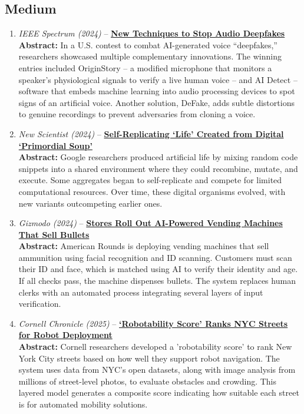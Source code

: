 \documentclass[12pt]{article}
\begin{document}
\subsection*{Medium}
\begin{enumerate}[label=\arabic*.]

 \item \textit{IEEE Spectrum (2024)} -- \href{https://technews.acm.org/archives.cfm?fo=2024-05-may#48}{\textbf{New Techniques to Stop Audio Deepfakes}}\\
\footnotesize\textbf{Abstract:} In a U.S. contest to combat AI-generated voice “deepfakes,” researchers showcased multiple complementary innovations. The winning entries included OriginStory – a modified microphone that monitors a speaker’s physiological signals to verify a live human voice – and AI Detect – software that embeds machine learning into audio processing devices to spot signs of an artificial voice. Another solution, DeFake, adds subtle distortions to genuine recordings to prevent adversaries from cloning a voice.\\

 \item \textit{New Scientist (2024)} -- \href{https://technews.acm.org/archives.cfm?fo=2024-07-jul#27}{\textbf{Self-Replicating ‘Life’ Created from Digital ‘Primordial Soup’}}\\
\footnotesize\textbf{Abstract:} Google researchers produced artificial life by mixing random code snippets into a shared environment where they could recombine, mutate, and execute. Some aggregates began to self-replicate and compete for limited computational resources. Over time, these digital organisms evolved, with new variants outcompeting earlier ones.\\

\clearpage
\item \textit{Gizmodo (2024)} -- \href{https://technews.acm.org/archives.cfm?fo=2024-07-jul#29}{\textbf{Stores Roll Out AI-Powered Vending Machines That Sell Bullets}}\\
   \footnotesize\textbf{Abstract:} American Rounds is deploying vending machines that sell ammunition using facial recognition and ID scanning. Customers must scan their ID and face, which is matched using AI to verify their identity and age. If all checks pass, the machine dispenses bullets. The system replaces human clerks with an automated process integrating several layers of input verification.
 \\

 \item \textit{Cornell Chronicle (2025)} -- \href{https://technews.acm.org/archives.cfm?fo=2025-04-apr#39}{\textbf{‘Robotability Score’ Ranks NYC Streets for Robot Deployment}}\\
   \footnotesize\textbf{Abstract:} Cornell researchers developed a 'robotability score' to rank New York City streets based on how well they support robot navigation. The system uses data from NYC’s open datasets, along with image analysis from millions of street-level photos, to evaluate obstacles and crowding. This layered model generates a composite score indicating how suitable each street is for automated mobility solutions.


\end{enumerate}
\end{document}
